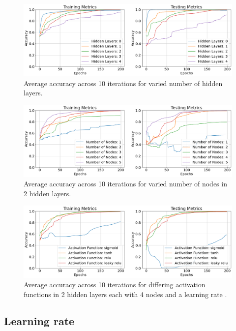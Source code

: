 \documentclass{article}
\begin{document}
\begin{figure}[H]
  \centering
  \includegraphics[width=\textwidth]{figs/layers.png}
  \caption{
    Average accuracy across 10 iterations for varied number of hidden
    layers.
  }
  \label{fig:layers}
\end{figure}

\begin{figure}[H]
  \centering
  \includegraphics[width=\textwidth]{figs/nodes.png}
  \caption{
    Average accuracy across 10 iterations for varied number of nodes
    in 2 hidden layers.
  }
  \label{fig:nodes}
\end{figure}

\begin{figure}[H]
  \centering
  \includegraphics[width=\textwidth]{figs/funcs.png}
  \caption{
    Average accuracy across 10 iterations for differing activation
    functions in 2 hidden layers each with 4 nodes and a learning rate
     .
  }
  \label{fig:funcs}
\end{figure}

\subsection{Learning rate}
\end{document}
